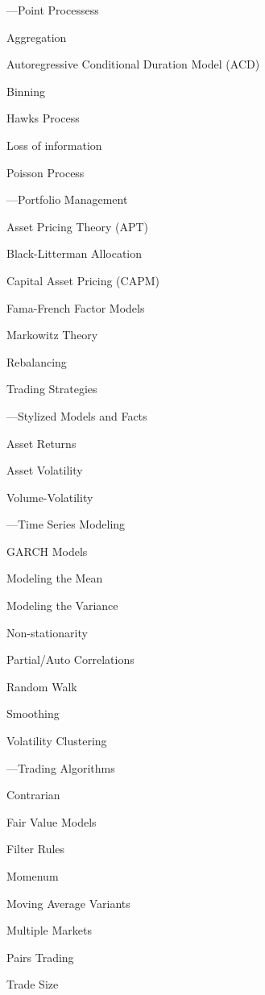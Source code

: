 %
\begin{minipage}{0.40\textwidth}
\noindent ---Point Processess
	\begin{flushright}
	Aggregation \par
	Autoregressive Conditional Duration Model (ACD) \par
	Binning \par
	Hawks Process \par
	Loss of information \par
	Poisson Process
	\end{flushright}

\noindent ---Portfolio Management 
	\begin{flushright}
	Asset Pricing Theory (APT) \par
	Black-Litterman Allocation \par 
	Capital Asset Pricing (CAPM) \par
	Fama-French Factor Models \par
	Markowitz Theory \par
	Rebalancing \par
	Trading Strategies 
	\end{flushright}


\noindent ---Stylized Models and Facts
	\begin{flushright}
	Asset Returns \par
	Asset Volatility \par
	Volume-Volatility 
	\end{flushright}
	

\noindent ---Time Series Modeling
	\begin{flushright}
	GARCH Models \par
	Modeling the Mean \par
	Modeling the Variance \par
	Non-stationarity \par
	Partial/Auto Correlations \par
	Random Walk \par
	Smoothing \par
	Volatility Clustering 
	\end{flushright}


\noindent ---Trading Algorithms
	\begin{flushright}
	Contrarian \par
	Fair Value Models \par
	Filter Rules \par
	Momenum \par
	Moving Average Variants \par
	Multiple Markets \par
	Pairs Trading \par
	Trade Size 
	\end{flushright}
\end{minipage}











	

